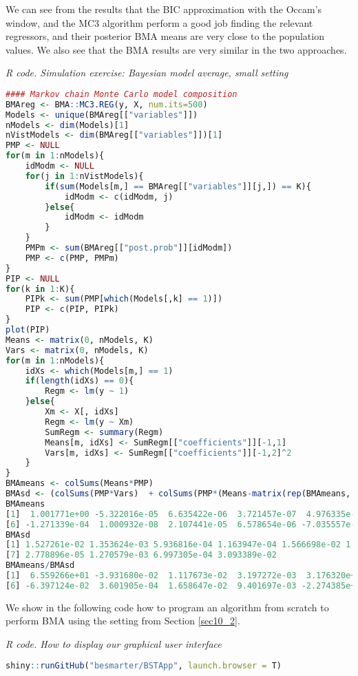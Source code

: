 We can see from the results that the BIC approximation with the Occam's window, and the MC3 algorithm perform a good job finding the relevant regressors, and their posterior BMA means are very close to the population values. We also see that the BMA results are very similar in the two approaches.

\begin{tcolorbox}[enhanced,width=4.67in,center upper,
	fontupper=\large\bfseries,drop shadow southwest,sharp corners]
	\textit{R code. Simulation exercise: Bayesian model average, small setting}
	\begin{VF}
		\begin{lstlisting}[language=R]
#### Markov chain Monte Carlo model composition
BMAreg <- BMA::MC3.REG(y, X, num.its=500)
Models <- unique(BMAreg[["variables"]])
nModels <- dim(Models)[1]
nVistModels <- dim(BMAreg[["variables"]])[1]
PMP <- NULL
for(m in 1:nModels){
	idModm <- NULL
	for(j in 1:nVistModels){
		if(sum(Models[m,] == BMAreg[["variables"]][j,]) == K){
			idModm <- c(idModm, j)
		}else{
			idModm <- idModm
		} 
	}
	PMPm <- sum(BMAreg[["post.prob"]][idModm])
	PMP <- c(PMP, PMPm)
}
PIP <- NULL
for(k in 1:K){
	PIPk <- sum(PMP[which(Models[,k] == 1)])
	PIP <- c(PIP, PIPk)
}
plot(PIP)
Means <- matrix(0, nModels, K)
Vars <- matrix(0, nModels, K)
for(m in 1:nModels){
	idXs <- which(Models[m,] == 1)
	if(length(idXs) == 0){
		Regm <- lm(y ~ 1)
	}else{
		Xm <- X[, idXs]
		Regm <- lm(y ~ Xm)
		SumRegm <- summary(Regm)
		Means[m, idXs] <- SumRegm[["coefficients"]][-1,1]
		Vars[m, idXs] <- SumRegm[["coefficients"]][-1,2]^2 
	} 
}
BMAmeans <- colSums(Means*PMP)
BMAsd <- (colSums(PMP*Vars)  + colSums(PMP*(Means-matrix(rep(BMAmeans, each = nModels), nModels, K))^2))^0.5
BMAmeans
[1]  1.001771e+00 -5.322016e-05  6.635422e-06  3.721457e-07  4.976335e-01
[6] -1.271339e-04  1.000932e-08  2.107441e-05  6.578654e-06 -7.035557e-01 
BMAsd
[1] 1.527261e-02 1.353624e-03 5.936816e-04 1.163947e-04 1.566698e-02 1.987360e-03
[7] 2.778896e-05 1.270579e-03 6.997305e-04 3.093389e-02
BMAmeans/BMAsd
[1]  6.559266e+01 -3.931680e-02  1.117673e-02  3.197272e-03  3.176320e+01
[6] -6.397124e-02  3.601905e-04  1.658647e-02  9.401697e-03 -2.274385e+01
\end{lstlisting}
	\end{VF}
\end{tcolorbox}

We show in the following code how to program an algorithm from scratch to perform BMA using the setting from Section \ref{sec10_2}. 

\begin{tcolorbox}[enhanced,width=4.67in,center upper,
	fontupper=\large\bfseries,drop shadow southwest,sharp corners]
	\textit{R code. How to display our graphical user interface}
	\begin{VF}
		\begin{lstlisting}[language=R]
		shiny::runGitHub("besmarter/BSTApp", launch.browser = T)\end{lstlisting}
	\end{VF}
\end{tcolorbox} 
 


